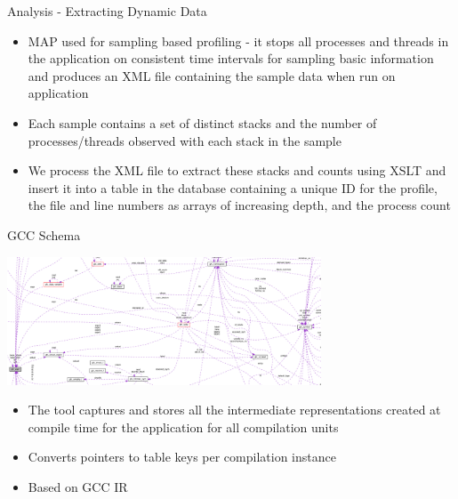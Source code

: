 \documentclass[final]{beamer}
\let\olditem\item
\renewcommand{\item}{\vspace{\fill}\olditem}
\begin{document}
\begin{frame}{\hspace{0.02\paperwidth}Analysis - Extracting Dynamic Data}
\begin{itemize}
\item MAP used for sampling based profiling - it stops all processes and threads in the application on consistent time intervals for sampling basic information and produces an \acs{XML} file containing the sample data when run on application
\item Each sample contains a set of distinct stacks and the number of processes/threads observed with each stack in the sample
\item We process the \acs{XML} file to extract these stacks and counts using \acs{XSLT} and insert it into a table in the database containing a unique ID for the profile, the file and line numbers as arrays of increasing depth, and the process count
\end{itemize}
\end{frame}

\begin{frame}{\hspace{0.02\paperwidth}GCC Schema}
\begin{center}
\includegraphics[width=0.7\textwidth]{images/gcc-schema.png}
\end{center}
\begin{itemize}
\item The tool captures and stores all the intermediate representations created at compile time for the application for all compilation units
\item Converts pointers to table keys per compilation instance
\item Based on \acs{GCC} \acs{IR}
\end{itemize}
\end{frame}
\end{document}

